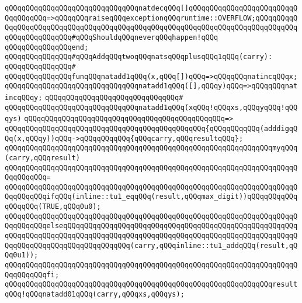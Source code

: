 \verb|qQQqqQQqqQQqqQQqqQQqqQQqqQQqqQQqnatdecqQQq[]qQQqqQQqqQQqqQQqqQQqqQQqqQQqqQQqqQQq=>qQQqqQQqraiseqQQqexceptionqQQqruntime::OVERFLOW;qQQqqQQqqQQqqQQqqQQqqQQqqQQqqQQqqQQqqQQqqQQqqQQqqQQqqQQqqQQqqQQqqQQqqQQqqQQqqQQqqQQqqQQqqQQqqQQq#qQQqShouldqQQqneverqQQqhappen!qQQq|\newline
\verb|qQQqqQQqqQQqqQQqend;|\newline
\newline
\newline
\verb|qQQqqQQqqQQqqQQq#qQQqAddqQQqtwoqQQqnatsqQQqplusqQQq1qQQq(carry):|\newline
\verb|qQQqqQQqqQQqqQQq#|\newline
\verb|qQQqqQQqqQQqqQQqfunqQQqnatadd1qQQq(x,qQQq[])qQQq=>qQQqqQQqnatincqQQqx;|\newline
\verb|qQQqqQQqqQQqqQQqqQQqqQQqqQQqqQQqnatadd1qQQq([],qQQqy)qQQq=>qQQqqQQqnatincqQQqy;|\newline
\verb|qQQqqQQqqQQqqQQqqQQqqQQqqQQqqQQq#|\newline
\verb|qQQqqQQqqQQqqQQqqQQqqQQqqQQqqQQqnatadd1qQQq(xqQQq!qQQqxs,qQQqyqQQq!qQQqys)|\newline
\verb|qQQqqQQqqQQqqQQqqQQqqQQqqQQqqQQqqQQqqQQqqQQqqQQq=>|\newline
\verb|qQQqqQQqqQQqqQQqqQQqqQQqqQQqqQQqqQQqqQQqqQQqqQQq{qQQqqQQqqQQq(adddigqQQq(x,qQQqy))qQQq->qQQqqQQqqQQq{qQQqcarry,qQQqresultqQQq};|\newline
\newline
\verb|qQQqqQQqqQQqqQQqqQQqqQQqqQQqqQQqqQQqqQQqqQQqqQQqqQQqqQQqqQQqqQQqmyqQQq(carry,qQQqresult)|\newline
\verb|qQQqqQQqqQQqqQQqqQQqqQQqqQQqqQQqqQQqqQQqqQQqqQQqqQQqqQQqqQQqqQQqqQQqqQQqqQQqqQQq=|\newline
\verb|qQQqqQQqqQQqqQQqqQQqqQQqqQQqqQQqqQQqqQQqqQQqqQQqqQQqqQQqqQQqqQQqqQQqqQQqqQQqqQQqifqQQq(inline::tu1_eqqQQq(result,qQQqmax_digit))qQQqqQQqqQQqqQQqqQQq(TRUE,qQQq0u0);|\newline
\verb|qQQqqQQqqQQqqQQqqQQqqQQqqQQqqQQqqQQqqQQqqQQqqQQqqQQqqQQqqQQqqQQqqQQqqQQqqQQqqQQqelseqQQqqQQqqQQqqQQqqQQqqQQqqQQqqQQqqQQqqQQqqQQqqQQqqQQqqQQqqQQqqQQqqQQqqQQqqQQqqQQqqQQqqQQqqQQqqQQqqQQqqQQqqQQqqQQqqQQqqQQqqQQqqQQqqQQqqQQqqQQqqQQqqQQqqQQqqQQq(carry,qQQqinline::tu1_addqQQq(result,qQQq0u1));|\newline
\verb|qQQqqQQqqQQqqQQqqQQqqQQqqQQqqQQqqQQqqQQqqQQqqQQqqQQqqQQqqQQqqQQqqQQqqQQqqQQqqQQqfi;|\newline
\newline
\verb|qQQqqQQqqQQqqQQqqQQqqQQqqQQqqQQqqQQqqQQqqQQqqQQqqQQqqQQqqQQqqQQqresultqQQq!qQQqnatadd01qQQq(carry,qQQqxs,qQQqys);|\newline
